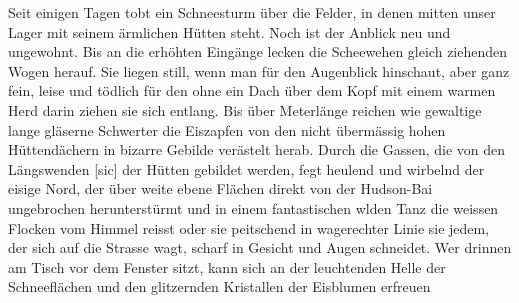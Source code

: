 \def\day{13. November 1942 *}
\mktitle

Seit einigen Tagen tobt ein Schneesturm \"{u}ber die Felder, in denen mitten unser Lager mit seinem \"{a}rmlichen H\"{u}tten steht.
Noch ist der Anblick neu und ungewohnt.
Bis an die erh\"{o}hten Eing\"{a}nge lecken die Scheewehen gleich ziehenden Wogen herauf.
Sie liegen still, wenn man f\"{u}r den Augenblick hinschaut, aber ganz fein, leise und t\"{o}dlich f\"{u}r den ohne ein Dach \"{u}ber dem Kopf mit einem warmen Herd darin ziehen sie sich entlang.
Bis \"{u}ber Meterl\"{a}nge reichen wie gewaltige lange gl\"{a}serne Schwerter die Eiszapfen von den nicht \"{u}berm\"{a}ssig hohen H\"{u}ttend\"{a}chern in bizarre Gebilde ver\"{a}stelt herab.
Durch die Gassen, die von den L\"{a}ngswenden{\color{red} [sic] } der H\"{u}tten gebildet werden, fegt heulend und wirbelnd der eisige Nord, der \"{u}ber weite ebene Fl\"{a}chen direkt von der Hudson-Bai ungebrochen herunterst\"{u}rmt und in einem fantastischen wlden Tanz die weissen Flocken vom Himmel reisst oder sie peitschend in wagerechter Linie sie jedem, der sich auf die Strasse wagt, scharf in Gesicht und Augen schneidet.
Wer drinnen am Tisch vor dem Fenster sitzt, kann sich an der leuchtenden Helle der Schneefl\"{a}chen und den glitzernden Kristallen der Eisblumen erfreuen

\clearpage

